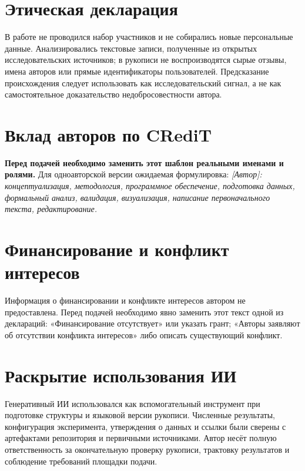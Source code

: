 \documentclass[11pt,a4paper]{article}
\begin{document}
\section*{Этическая декларация}

В работе не проводился набор участников и не собирались новые персональные данные. Анализировались текстовые записи, полученные из открытых исследовательских источников; в рукописи не воспроизводятся сырые отзывы, имена авторов или прямые идентификаторы пользователей. Предсказание происхождения следует использовать как исследовательский сигнал, а не как самостоятельное доказательство недобросовестности автора.

\section*{Вклад авторов по CRediT}

\textbf{Перед подачей необходимо заменить этот шаблон реальными именами и ролями.} Для одноавторской версии ожидаемая формулировка: \textit{[Автор]: концептуализация, методология, программное обеспечение, подготовка данных, формальный анализ, валидация, визуализация, написание первоначального текста, редактирование.}

\section*{Финансирование и конфликт интересов}

Информация о финансировании и конфликте интересов автором не предоставлена. Перед подачей необходимо явно заменить этот текст одной из деклараций: «Финансирование отсутствует» или указать грант; «Авторы заявляют об отсутствии конфликта интересов» либо описать существующий конфликт.

\section*{Раскрытие использования ИИ}

Генеративный ИИ использовался как вспомогательный инструмент при подготовке структуры и языковой версии рукописи. Численные результаты, конфигурация эксперимента, утверждения о данных и ссылки были сверены с артефактами репозитория и первичными источниками. Автор несёт полную ответственность за окончательную проверку рукописи, трактовку результатов и соблюдение требований площадки подачи.



\end{document}
